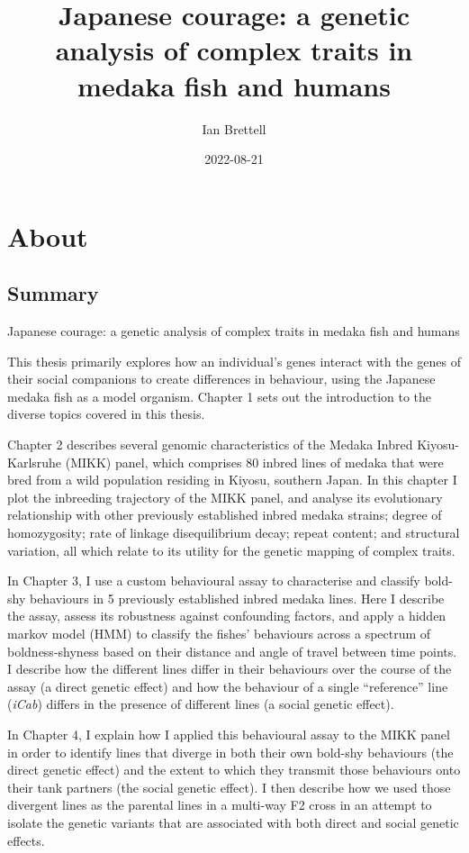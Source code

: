 \documentclass[
]{book}
\title{Japanese courage: a genetic analysis of complex traits in medaka fish and humans}
\author{Ian Brettell}
\date{2022-08-21}
\begin{document}
\maketitle

{
\setcounter{tocdepth}{1}
\tableofcontents
}
\hypertarget{about}{%
\chapter*{About}\label{about}}

\hypertarget{summary}{%
\section{Summary}\label{summary}}

Japanese courage: a genetic analysis of complex traits in medaka fish and humans

This thesis primarily explores how an individual's genes interact with the genes of their social companions to create differences in behaviour, using the Japanese medaka fish as a model organism. Chapter 1 sets out the introduction to the diverse topics covered in this thesis.

Chapter 2 describes several genomic characteristics of the Medaka Inbred Kiyosu-Karlsruhe (MIKK) panel, which comprises 80 inbred lines of medaka that were bred from a wild population residing in Kiyosu, southern Japan. In this chapter I plot the inbreeding trajectory of the MIKK panel, and analyse its evolutionary relationship with other previously established inbred medaka strains; degree of homozygosity; rate of linkage disequilibrium decay; repeat content; and structural variation, all which relate to its utility for the genetic mapping of complex traits.

In Chapter 3, I use a custom behavioural assay to characterise and classify bold-shy behaviours in 5 previously established inbred medaka lines. Here I describe the assay, assess its robustness against confounding factors, and apply a hidden markov model (HMM) to classify the fishes' behaviours across a spectrum of boldness-shyness based on their distance and angle of travel between time points. I describe how the different lines differ in their behaviours over the course of the assay (a direct genetic effect) and how the behaviour of a single ``reference'' line (\emph{iCab}) differs in the presence of different lines (a social genetic effect).

In Chapter 4, I explain how I applied this behavioural assay to the MIKK panel in order to identify lines that diverge in both their own bold-shy behaviours (the direct genetic effect) and the extent to which they transmit those behaviours onto their tank partners (the social genetic effect). I then describe how we used those divergent lines as the parental lines in a multi-way F2 cross in an attempt to isolate the genetic variants that are associated with both direct and social genetic effects.
\end{document}

